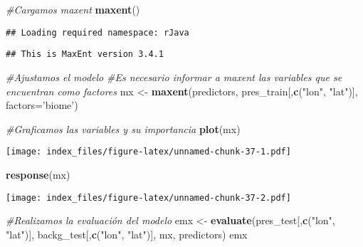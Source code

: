 \documentclass[]{article}
\newenvironment{Shaded}{\begin{snugshade}}{\end{snugshade}}
\newcommand{\KeywordTok}[1]{\textcolor[rgb]{0.13,0.29,0.53}{\textbf{{#1}}}}
\newcommand{\DataTypeTok}[1]{\textcolor[rgb]{0.13,0.29,0.53}{{#1}}}
\newcommand{\StringTok}[1]{\textcolor[rgb]{0.31,0.60,0.02}{{#1}}}
\newcommand{\CommentTok}[1]{\textcolor[rgb]{0.56,0.35,0.01}{\textit{{#1}}}}
\newcommand{\NormalTok}[1]{{#1}}
\begin{document}
\begin{Shaded}
\begin{Highlighting}[]
\CommentTok{#Cargamos maxent}
\KeywordTok{maxent}\NormalTok{()}
\end{Highlighting}
\end{Shaded}

\begin{verbatim}
## Loading required namespace: rJava
\end{verbatim}

\begin{verbatim}
## This is MaxEnt version 3.4.1
\end{verbatim}

\begin{Shaded}
\begin{Highlighting}[]
\CommentTok{#Ajustamos el modelo}
\CommentTok{#Es necesario informar a maxent las variables que se encuentran como factores}
\NormalTok{mx <-}\StringTok{ }\KeywordTok{maxent}\NormalTok{(predictors, pres_train[,}\KeywordTok{c}\NormalTok{(}\StringTok{"lon"}\NormalTok{, }\StringTok{"lat"}\NormalTok{)], }\DataTypeTok{factors=}\StringTok{'biome'}\NormalTok{)}

\CommentTok{#Graficamos las variables y su importancia}
\KeywordTok{plot}\NormalTok{(mx)}
\end{Highlighting}
\end{Shaded}

\texttt{[image: index\_files/figure-latex/unnamed-chunk-37-1.pdf]}

\begin{Shaded}
\begin{Highlighting}[]
\KeywordTok{response}\NormalTok{(mx)}
\end{Highlighting}
\end{Shaded}

\texttt{[image: index\_files/figure-latex/unnamed-chunk-37-2.pdf]}

\begin{Shaded}
\begin{Highlighting}[]
\CommentTok{#Realizamos la evaluación del modelo}
\NormalTok{emx <-}\StringTok{ }\KeywordTok{evaluate}\NormalTok{(pres_test[,}\KeywordTok{c}\NormalTok{(}\StringTok{"lon"}\NormalTok{, }\StringTok{"lat"}\NormalTok{)], backg_test[,}\KeywordTok{c}\NormalTok{(}\StringTok{"lon"}\NormalTok{, }\StringTok{"lat"}\NormalTok{)], mx, predictors)}
\NormalTok{emx}
\end{Highlighting}
\end{Shaded}
\end{document}

